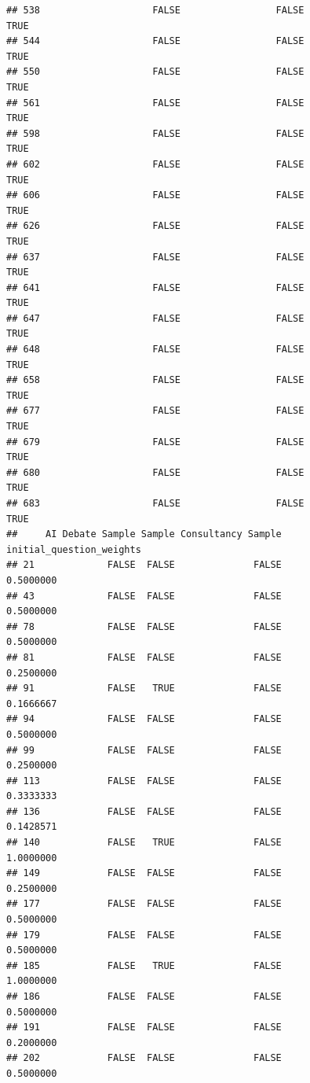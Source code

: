 \documentclass[
]{article}
\begin{document}
\begin{verbatim}
## 538                    FALSE                 FALSE                TRUE
## 544                    FALSE                 FALSE                TRUE
## 550                    FALSE                 FALSE                TRUE
## 561                    FALSE                 FALSE                TRUE
## 598                    FALSE                 FALSE                TRUE
## 602                    FALSE                 FALSE                TRUE
## 606                    FALSE                 FALSE                TRUE
## 626                    FALSE                 FALSE                TRUE
## 637                    FALSE                 FALSE                TRUE
## 641                    FALSE                 FALSE                TRUE
## 647                    FALSE                 FALSE                TRUE
## 648                    FALSE                 FALSE                TRUE
## 658                    FALSE                 FALSE                TRUE
## 677                    FALSE                 FALSE                TRUE
## 679                    FALSE                 FALSE                TRUE
## 680                    FALSE                 FALSE                TRUE
## 683                    FALSE                 FALSE                TRUE
##     AI Debate Sample Sample Consultancy Sample initial_question_weights
## 21             FALSE  FALSE              FALSE                0.5000000
## 43             FALSE  FALSE              FALSE                0.5000000
## 78             FALSE  FALSE              FALSE                0.5000000
## 81             FALSE  FALSE              FALSE                0.2500000
## 91             FALSE   TRUE              FALSE                0.1666667
## 94             FALSE  FALSE              FALSE                0.5000000
## 99             FALSE  FALSE              FALSE                0.2500000
## 113            FALSE  FALSE              FALSE                0.3333333
## 136            FALSE  FALSE              FALSE                0.1428571
## 140            FALSE   TRUE              FALSE                1.0000000
## 149            FALSE  FALSE              FALSE                0.2500000
## 177            FALSE  FALSE              FALSE                0.5000000
## 179            FALSE  FALSE              FALSE                0.5000000
## 185            FALSE   TRUE              FALSE                1.0000000
## 186            FALSE  FALSE              FALSE                0.5000000
## 191            FALSE  FALSE              FALSE                0.2000000
## 202            FALSE  FALSE              FALSE                0.5000000

\end{verbatim}
\end{document}
